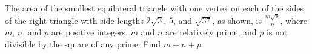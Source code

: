 The area of the smallest equilateral triangle with one vertex on each of the sides of the right triangle with side lengths $2\sqrt3$,  $5$,  and $\sqrt{37}$,  as shown, is $\tfrac{m\sqrt{p}}{n}$,  where $m$,  $n$,  and $p$ are positive integers, $m$ and $n$ are relatively prime, and $p$ is not divisible by the square of any prime. Find $m+n+p$.
